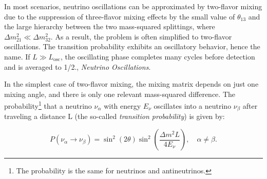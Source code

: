 
In most scenarios, neutrino oscillations can be approximated by two-flavor mixing due to the suppression of three-flavor mixing effects by the small value of $\theta_{13}$ and the large hierarchy between the two mass-squared splittings, where $\Delta m_{21}^2 \ll \Delta m_{32}^2$. As a result, the problem is often simplified to two-flavor oscillations. The transition probability exhibits an oscillatory behavior, hence the name. If $L \gg L_{\mathrm{osc}}$, the oscillating phase completes many cycles before detection and is averaged to 1/2., \emph{Neutrino Oscillations}.

In the simplest case of two-flavor mixing, the mixing matrix depends on just one mixing angle, and there is only one relevant mass-squared difference. The probability\footnote{The probability is the same for neutrinos and antineutrinos.} that a neutrino $\nu_{\alpha}$ with energy $E_{\nu}$ oscillates into a neutrino $\nu_{\beta}$ after traveling a distance L (the so-called \emph{transition probability}) is given by:

\begin{equation}\label{eq:twoflavour_transition}
P(\nu_\alpha \rightarrow \nu_\beta) = \sin^2(2\theta) \sin^2\left(\frac{\Delta m^2 L}{4 E_\nu}\right), \quad \alpha \neq \beta.
\end{equation}

